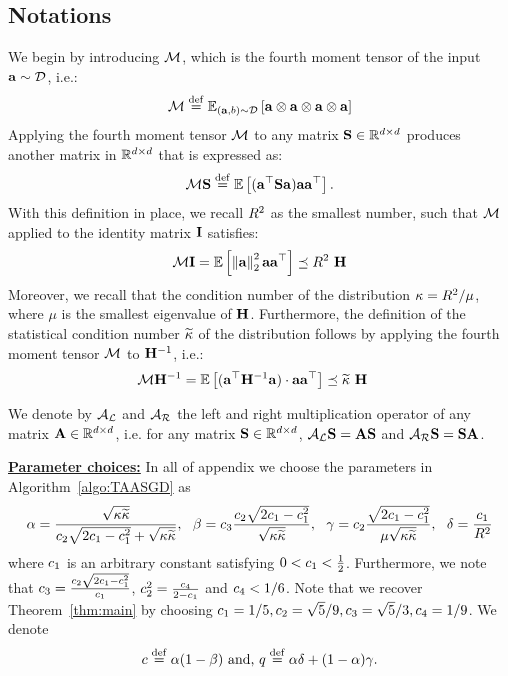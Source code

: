 \subsection{Notations}
\label{ssec:notations}

We begin by introducing $\mathcal{M}$, which is the fourth moment tensor of the input $\mathbf{a}\sim\mathcal{D}$, i.e.:
\begin{align*}
\mathcal{M}\stackrel{\mathrm{def}}{=}\mathbb{E}_{(\mathbf{a},b)\sim \mathcal{D}}\left[\mathbf{a}\otimes\mathbf{a}\otimes\mathbf{a}\otimes\mathbf{a}\right]
\end{align*}
Applying the fourth moment tensor $\mathcal{M}$ to any matrix $\mathbf{S}\in\mathbb{R}^{d\times d}$ produces another matrix in $\mathbb{R}^{d\times d}$ that is expressed as: 
\begin{align*}
\mathcal{M}\mathbf{S} \stackrel{\mathrm{def}}{=} \mathbb{E}\left[(\mathbf{a}^{\top}\mathbf{S}\mathbf{a})\mathbf{a}\mathbf{a}^{\top}\right]. 
\end{align*}
With this definition in place, we recall $R^2$ as the smallest number, such that $\mathcal{M}$ applied to the identity matrix $\mathbf{I}$ satisfies:
\begin{align*}
\mathcal{M}\mathbf{I}=\mathbb{E}\left[\left\| \mathbf{a} \right\|_2^2\mathbf{a}\mathbf{a}^{\top}\right]\preceq R^2\ \mathbf{H}
\end{align*}
Moreover, we recall that the condition number of the distribution ${\kappa} = R^2/\mu$, where $\mu$ is the smallest eigenvalue of $\mathbf{H}$. Furthermore, the definition of the statistical condition number $\widetilde{\kappa}$ of the distribution follows by applying the fourth moment tensor $\mathcal{M}$ to $\mathbf{H}^{-1}$, i.e.:
\begin{align*}
\mathcal{M}\mathbf{H}^{-1}&=\mathbb{E}\left[(\mathbf{a}^{\top}\mathbf{H}^{-1}\mathbf{a})\cdot\mathbf{a}\mathbf{a}^{\top}\right]\preceq\widetilde{\kappa}\ \mathbf{H}
\end{align*}

We denote by $\mathcal{A}_{\mathcal{L}}$ and $\mathcal{A}_{\mathcal{R}}$ the left and right multiplication operator of any matrix $\mathbf{A}\in\mathbb{R}^{d\times d}$, i.e. for any matrix $\mathbf{S}\in\mathbb{R}^{d\times d}$, $\mathcal{A}_{\mathcal{L}}\mathbf{S}=\mathbf{A}\mathbf{S}$ and $\mathcal{A}_{\mathcal{R}}\mathbf{S}=\mathbf{S}\mathbf{A}$.

\underline{\bf Parameter choices:} In all of appendix we choose the parameters in Algorithm~\ref{algo:TAASGD} as
\begin{align*}
\alpha = \frac{\sqrt{\cnH\cnHh}}{\ctwo\sqrt{2\cone-\cone^2}+\sqrt{\cnH\cnHh}},\ \  \beta = \cthree\frac{\ctwo\sqrt{2\cone-\cone^2}}{\sqrt{\cnH\cnHh}},\ \  \gamma = \ctwo\frac{\sqrt{2\cone-\cone^2}}{\mu\sqrt{\cnH\cnHh}}, \ \ \delta=\frac{\cone}{\infbound}
\end{align*}
where $c_1$ is an arbitrary constant satisfying $0 < c_1 < \frac{1}{2}$. Furthermore, we note that $c_3=\frac{c_2\sqrt{2c_1-c_1^2}}{c_1}$, $c_2^2=\frac{c_4}{2-c_1}$ and $c_4< 1/6$. 
Note that we recover Theorem~\ref{thm:main} by choosing $c_1 = 1/5, c_2 = \sqrt{5}/9, c_3=\sqrt{5}/3, c_4 = 1/9$. We denote 
\begin{align*}
c\stackrel{\mathrm{def}}{=}\alpha(1-\beta) \text{ and, } q\stackrel{\mathrm{def}}{=}\alpha\delta+(1-\alpha)\gamma.
\end{align*}

